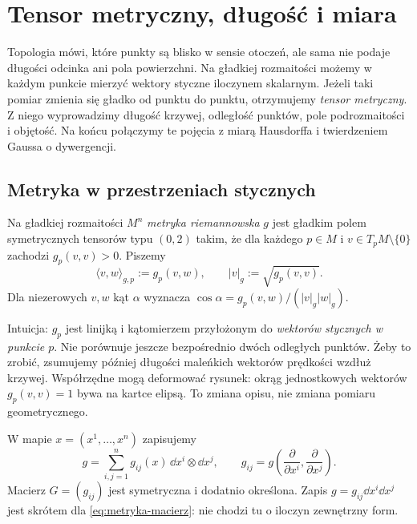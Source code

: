\chapter{Tensor metryczny, długość i miara}
\label{ch:metryka-riemannowska}

\providecommand{\atlasref}[2]{#2}


Topologia mówi, które punkty są blisko w sensie otoczeń,
ale sama nie podaje długości odcinka ani pola powierzchni.
Na gładkiej rozmaitości możemy w każdym punkcie mierzyć
wektory styczne iloczynem skalarnym. Jeżeli taki pomiar
zmienia się gładko od punktu do punktu, otrzymujemy
\emph{tensor metryczny}. Z niego wyprowadzimy długość
krzywej, odległość punktów, pole podrozmaitości i objętość.
Na końcu połączymy te pojęcia z miarą Hausdorffa
i twierdzeniem Gaussa o dywergencji.

\section{Metryka w przestrzeniach stycznych}
\label{sec:metryka-definicja}

\begin{definicja}
\label{def:metryka-riemannowska}
Na gładkiej rozmaitości $M^n$ \emph{metryka riemannowska}
$g$ jest gładkim polem symetrycznych tensorów typu $(0,2)$
takim, że dla każdego $p\in M$ i $v\in T_pM\setminus\{0\}$
zachodzi $g_p(v,v)>0$. Piszemy
\[
 \langle v,w\rangle_{g,p}:=g_p(v,w),
 \qquad |v|_g:=\sqrt{g_p(v,v)}.
\]
Dla niezerowych $v,w$ kąt $\alpha$ wyznacza
$\cos\alpha=g_p(v,w)/(|v|_g|w|_g)$.
\end{definicja}

Intuicja: $g_p$ jest linijką i kątomierzem przyłożonym
do \emph{wektorów stycznych w punkcie $p$}. Nie porównuje
jeszcze bezpośrednio dwóch odległych punktów. Żeby to zrobić,
zsumujemy później długości maleńkich wektorów prędkości
wzdłuż krzywej. Współrzędne mogą deformować rysunek:
okrąg jednostkowych wektorów $g_p(v,v)=1$ bywa na kartce
elipsą. To zmiana opisu, nie zmiana pomiaru geometrycznego.

W mapie $x=(x^1,\ldots,x^n)$ zapisujemy
\begin{equation}\label{eq:metryka-macierz}
 g=\sum_{i,j=1}^n g_{ij}(x)\,\dd x^i\otimes\dd x^j,
 \qquad g_{ij}=g\!\left(\frac{\partial}{\partial x^i},
                          \frac{\partial}{\partial x^j}\right).
\end{equation}
Macierz $G=(g_{ij})$ jest symetryczna i dodatnio określona.
Zapis $g=g_{ij}\dd x^i\dd x^j$ jest skrótem
dla \eqref{eq:metryka-macierz}: nie chodzi tu o iloczyn
zewnętrzny form.

